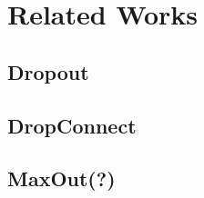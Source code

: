 \section{Related Works}
\label{sec:related}

\subsection{Dropout}

\subsection{DropConnect}

\subsection{MaxOut(?)}

